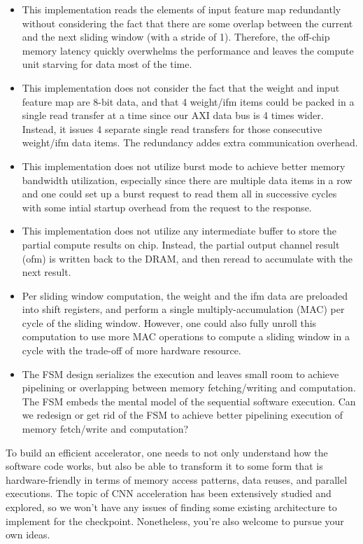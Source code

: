 \documentclass[11pt]{article}
\begin{document}
\begin{itemize}
\item This implementation reads the elements of input feature map redundantly without considering the fact that there are some overlap between the current and the next sliding window (with a stride of 1). Therefore, the off-chip memory latency quickly overwhelms the performance and leaves the compute unit starving for data most of the time.
\item This implementation does not consider the fact that the weight and input feature map are 8-bit data, and that 4 weight/ifm items could be packed in a single read transfer at a time since our AXI data bus is 4 times wider. Instead, it issues 4 separate single read transfers for those consecutive weight/ifm data items. The redundancy addes extra communication overhead.
\item This implementation does not utilize burst mode to achieve better memory bandwidth utilization, especially since there are multiple data items in a row and one could set up a burst request to read them all in successive cycles with some intial startup overhead from the request to the response.
\item This implementation does not utilize any intermediate buffer to store the partial compute results on chip. Instead, the partial output channel result (ofm) is written back to the DRAM, and then reread to accumulate with the next result.
\item Per sliding window computation, the weight and the ifm data are preloaded into shift registers, and perform a single multiply-accumulation (MAC) per cycle of the sliding window. However, one could also fully unroll this computation to use more MAC operations to compute a sliding window in a cycle with the trade-off of more hardware resource.
\item The FSM design serializes the execution and leaves small room to achieve pipelining or overlapping between memory fetching/writing and computation. The FSM embeds the mental model of the sequential software execution. Can we redesign or get rid of the FSM to achieve better pipelining execution of memory fetch/write and computation?
\end{itemize}

To build an efficient accelerator, one needs to not only understand how the software code works, but also be able to transform it to some form that is hardware-friendly in terms of memory access patterns, data reuses, and parallel executions. The topic of CNN acceleration has been extensively studied and explored, so we won't have any issues of finding some existing architecture to implement for the checkpoint. Nonetheless, you're also welcome to pursue your own ideas.
\end{document}
